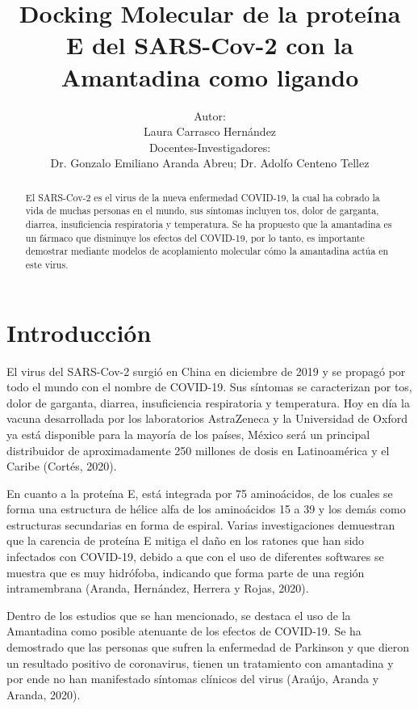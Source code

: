 \documentclass[12pt]{article}
\title{Docking Molecular de la proteína E del SARS-Cov-2 con la Amantadina como ligando}
\author{Autor:\\
        Laura Carrasco Hernández\inst{1}\\ 
        Docentes-Investigadores:\\
        Dr. Gonzalo Emiliano Aranda Abreu\inst{1}; Dr. Adolfo Centeno Tellez\inst{1}}
\begin{document}
 
	
	\maketitle
	\begin{abstract} 
	El SARS-Cov-2 es el virus de la nueva enfermedad COVID-19, la cual ha cobrado la vida de muchas personas en el mundo, sus síntomas incluyen tos, dolor de garganta, diarrea, insuficiencia respiratoria y temperatura. 
	Se ha propuesto que la amantadina es un fármaco que disminuye los efectos del COVID-19, por lo tanto, es importante demostrar mediante modelos de acoplamiento molecular cómo la amantadina actúa en este virus.

\end{abstract}

	
	\section{Introducción}
	\label{sec:introducao}
	
El virus del SARS-Cov-2 surgió en China en diciembre de 2019 y se propagó por todo el mundo con el nombre de COVID-19. Sus síntomas se caracterizan por tos, dolor de garganta, diarrea, insuficiencia respiratoria y temperatura. Hoy en día la vacuna desarrollada por los laboratorios AstraZeneca y la Universidad de Oxford ya está disponible para la mayoría de los países, México será un principal distribuidor de aproximadamente 250 millones de dosis en Latinoamérica y el Caribe (Cortés, 2020).

En cuanto a la proteína E, está integrada por 75 aminoácidos, de los cuales se forma una estructura de hélice alfa de los aminoácidos 15 a 39 y los demás como estructuras secundarias en forma de espiral.
Varias investigaciones demuestran que la carencia de proteína E mitiga el daño en los ratones que han sido infectados con COVID-19, debido a que con el uso de diferentes softwares se muestra que es muy hidrófoba, indicando que forma parte de una región intramembrana (Aranda, Hernández, Herrera y Rojas, 2020). 

Dentro de los estudios que se han mencionado, se destaca el uso de la Amantadina como posible atenuante de los efectos de COVID-19. Se ha demostrado que las personas que sufren la enfermedad de Parkinson y que dieron un resultado positivo de coronavirus, tienen un tratamiento con amantadina y por ende no han manifestado síntomas clínicos del virus (Araújo, Aranda y Aranda, 2020).
\end{document}
